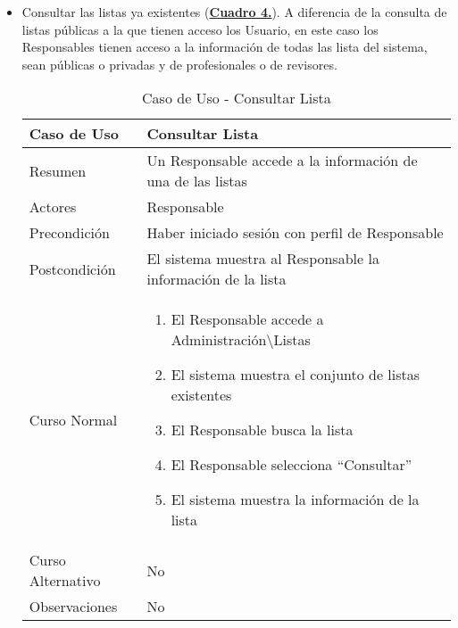 \begin{itemize}
  \pagebreak
	\item \addtocounter{tabla}{1} Consultar las listas ya existentes (\textbf{\hyperref[tab:curConsultarLista]{Cuadro 4.}}). A diferencia de la consulta de listas públicas a la que tienen acceso los Usuario, en este caso los Responsables tienen acceso a la información de todas las lista del sistema, sean públicas o privadas y de profesionales o de revisores.
		\begin{table}[!htbp]
		  \centering  \addtocounter{casouso}{1}
		  \begin{tabular}{|l | p{100mm}|}
		    \textbf{Caso de Uso}  & \textbf{Consultar Lista} \\ \hline
		    Resumen 		 & Un Responsable accede a la información de una de las listas \\ \hline
		    Actores  		 & Responsable \\ \hline
		    Precondición  	 & Haber iniciado sesión con perfil de Responsable \\ \hline
		    Postcondición  	 & El sistema muestra al Responsable la información de la lista \\ \hline
		    Curso Normal   	 & \begin{enumerate}
			  \item El Responsable accede a Administración\textbackslash Listas
			  \item El sistema muestra el conjunto de listas existentes
			  \item El Responsable busca la lista
			  \item El Responsable selecciona ``Consultar''
			  \item El sistema muestra la información de la lista
		    \end{enumerate}  \\ \hline
		    Curso Alternativo  & No  \\ \hline
		    Observaciones 	 & No \\ \hline
		  \end{tabular}
		  \caption{Caso de Uso  - Consultar Lista}
		  \label{tab:curConsultarLista}
		\end{table}
		\FloatBarrier 
  

\end{itemize}
